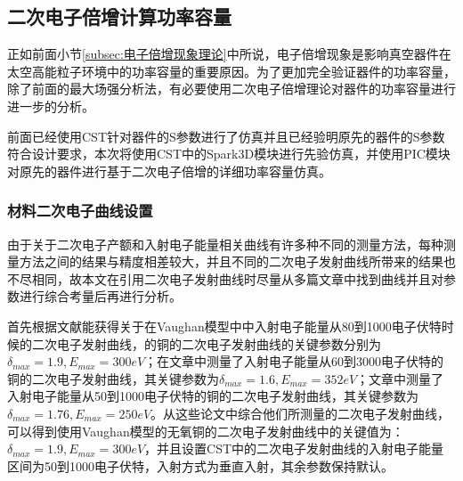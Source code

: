 \documentclass[master]{thesis-uestc}
\begin{document}
\subsection{二次电子倍增计算功率容量}\label{subsec:X二次电子倍增功率容量}
正如前面小节\ref{subsec:电子倍增现象理论}中所说，电子倍增现象是影响真空器件在太空高能粒子环境中的功率容量的重要原因。为了更加完全验证器件的功率容量，除了前面的最大场强分析法，有必要使用二次电子倍增理论对器件的功率容量进行进一步的分析。

前面已经使用CST针对器件的S参数进行了仿真并且已经验明原先的器件的S参数符合设计要求，本次将使用CST中的Spark3D模块进行先验仿真，并使用PIC模块对原先的器件进行基于二次电子倍增的详细功率容量仿真。

\subsubsection{材料二次电子曲线设置}
由于关于二次电子产额和入射电子能量相关曲线有许多种不同的测量方法，每种测量方法之间的结果与精度相差较大，并且不同的二次电子发射曲线所带来的结果也不尽相同，故本文在引用二次电子发射曲线时尽量从多篇文章中找到曲线并且对参数进行综合考量后再进行分析。

首先根据文献\cite{valizadeh_2014_wja}能获得关于在Vaughan模型中中入射电子能量从80到1000电子伏特时候的二次电子发射曲线，的铜的二次电子发射曲线的关键参数分别为$\delta_{max}=1.9, E_{max}=300 eV$；在文章\cite{bojko_2020_see}中测量了入射电子能量从60到3000电子伏特的铜的二次电子发射曲线，其关键参数为$\delta_{max}=1.6, E_{max}=352 eV$；文章\cite{jianweifang_lizi_2023}中测量了入射电子能量从50到1000电子伏特的铜的二次电子发射曲线，其关键参数为$\delta_{max}=1.76, E_{max}=250 eV$。从这些论文中综合他们所测量的二次电子发射曲线，可以得到使用Vaughan模型的无氧铜的二次电子发射曲线中的关键值为：$\delta_{max}=1.9, E_{max}=300 eV$，并且设置CST中的二次电子发射曲线的入射电子能量区间为50到1000电子伏特，入射方式为垂直入射，其余参数保持默认。
\end{document}
